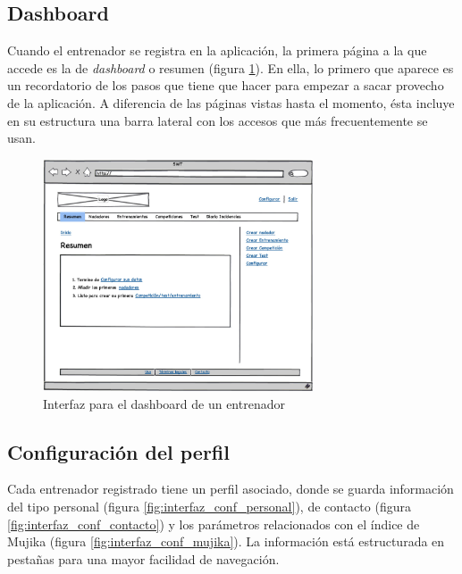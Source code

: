 	\subsection{Dashboard} %
		\label{sub:interfaz_dashboard}
	
	Cuando el entrenador se registra en la aplicación, la primera página a la que accede es la de {\it dashboard} o resumen (figura \ref{fig:interfaz_dashboard}). En ella, lo primero que aparece es un recordatorio de los pasos que tiene que hacer para empezar a sacar provecho de la aplicación. A diferencia de las páginas vistas hasta el momento, ésta incluye en su estructura una barra lateral con los accesos que más frecuentemente se usan.
		
		\begin{figure}[H]
		  \centering
		    \includegraphics[width=8cm]{./eps/6_Dashboard.eps}
		  \caption{Interfaz para el dashboard de un entrenador}
		  \label{fig:interfaz_dashboard}
		\end{figure}
		
	
	\subsection{Configuración del perfil} %
		\label{sub:configuracion_del_perfil}
	
	Cada entrenador registrado tiene un perfil asociado, donde se guarda información del tipo personal (figura \ref{fig:interfaz_conf_personal}), de contacto (figura \ref{fig:interfaz_conf_contacto}) y los parámetros relacionados con el índice de Mujika (figura \ref{fig:interfaz_conf_mujika}). La información está estructurada en pestañas para una mayor facilidad de navegación.
	
